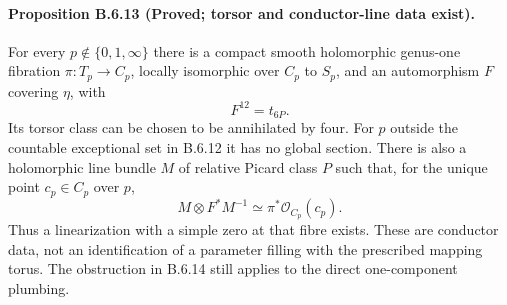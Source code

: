 \paragraph{Proposition B.6.13 (Proved; torsor and conductor-line data exist).}
For every $p\notin\{0,1,\infty\}$ there is a compact smooth
holomorphic genus-one fibration $\pi:T_p\to C_p$, locally
isomorphic over $C_p$ to $S_p$, and an automorphism $F$ covering
$\eta$, with
\[
 F^{12}=t_{6P}.
 \tag{B.6.21}
\]
Its torsor class can be chosen to be annihilated by four.
For $p$ outside the countable exceptional set in B.6.12 it
has no global section. There is also a holomorphic line bundle
$M$ of relative Picard class $P$ such that, for the unique
point $c_p\in C_p$ over $p$,
\[
 M\otimes F^*M^{-1}\simeq\pi^*\mathcal O_{C_p}(c_p).
 \tag{B.6.22}
\]
Thus a linearization with a simple zero at that fibre exists.
These are conductor data, not an identification of a parameter
filling with the prescribed mapping torus. The obstruction in
B.6.14 still applies to the direct one-component plumbing.


